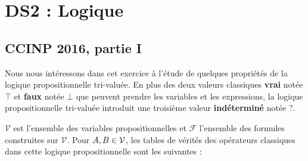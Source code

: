 
\chapter{DS2 : Logique}
\section{CCINP 2016, partie I}

Nous nous intéressons dans cet exercice à l'étude de quelques
propriétés de la logique propositionnelle tri-valuée. En plus
des deux valeurs classiques {\bf vrai} notée $\top$ et {\bf faux} notée $\bot$ que peuvent prendre les variables et les expressions, la logique propositionnelle tri-valuée introduit une troisième valeur {\bf indéterminé} notée $?$.

$\mathcal{V}$ est l'ensemble des variables propositionnelles et $\mathcal{F}$
l'ensemble des formules construites sur $\mathcal{V}$. Pour $A,B\in \mathcal{%
V}$, les tables de vérités des opérateurs classiques dans cette
logique propositionnelle sont les suivantes :

